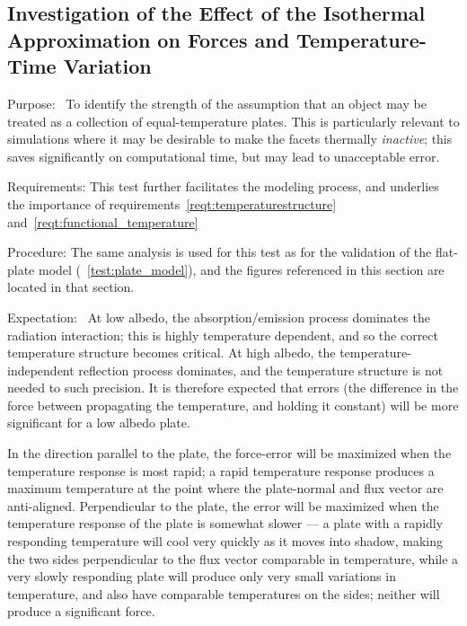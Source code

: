 \subsection{Investigation of the Effect of the Isothermal Approximation on Forces and
Temperature-Time Variation}
  \label{test:isothermal}
  \begin{description}
  \item{Purpose:}\ \newline
    To identify the strength of the assumption that an object may be treated
    as a collection of equal{}-temperature plates.  This is particularly relevant to simulations where it may be desirable to make the facets thermally \textit{inactive}; this saves significantly on computational time, but may lead to unacceptable error.
  \item{Requirements:}\newline
    This test further facilitates the modeling process, and underlies the
    importance of requirements~\ref{reqt:temperaturestructure}
    and~\ref{reqt:functional_temperature}
  \item{Procedure:}\newline
     The same analysis is used for this test as for the validation of the
     flat-plate model (~\ref{test:plate_model}), and the figures referenced
     in this section are located in that section.

   \item{Expectation:}\ \newline
     At low albedo, the absorption/emission process dominates the radiation
     interaction; this is highly temperature dependent, and so the correct
     temperature structure becomes critical.  At high albedo, the
     temperature-independent reflection process dominates, and the
     temperature structure is not needed to such precision.  It is therefore
     expected that errors (the difference in the force between propagating the temperature, and holding it constant) will be more significant for a low albedo plate.

     In the direction parallel to the plate, the force-error will be maximized
     when the temperature response is most rapid; a rapid temperature response produces a maximum temperature
     at the point where the plate-normal and flux vector are
     anti-aligned.  Perpendicular to the plate, the error
     will be maximized when the temperature response of the plate is
     somewhat slower ---  a plate with a rapidly responding temperature will cool very quickly as it moves into shadow, making the two sides perpendicular to the flux vector comparable in temperature, while a very
     slowly responding plate will produce only very small variations in temperature, and also have comparable temperatures on the sides; neither
     will produce a significant force.


\end{description}
